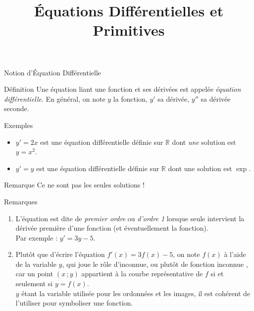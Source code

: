\documentclass{cours}
\title{Équations Différentielles et Primitives}
\begin{document}

    \begin{Gpartie}{Notion d'Équation Différentielle} 
        \begin{Spartie}{Définition} 
            Une équation liant une fonction et ses dérivées est appelée \emph{équation différentielle}. En général, on note $y$ la fonction, $y'$ sa dérivée, $y''$ sa dérivée seconde.
        \end{Spartie}
        \begin{Spartie}{Exemples} 
            \begin{itemize}
                \item $y'=2x$ est une équation différentielle définie sur $\mathbb{R}$ dont \textit{une} solution est~$y=x^2$.
                \item $y'=y$ est une équation différentielle définie sur $\mathbb{R}$ dont une solution est $\exp$.
            \end{itemize}
            \begin{SSpartie}{Remarque} 
                Ce ne sont pas les seules solutions !
            \end{SSpartie}
        \end{Spartie}
        \begin{Spartie}{Remarques} 
            \begin{enumerate}[(1)]
                \item L'équation est dite de \emph{premier ordre} ou \emph{d'ordre 1} lorsque seule intervient la dérivée première d'une fonction (et éventuellement la fonction). \\ Par exemple : $y'=3y-5$.
                \item Plutôt que d'écrire l'équation $f'(x)=3f(x)-5$, on note $f(x)$ à l'aide de la variable $y$, qui joue le rôle d'inconnue, ou plutôt de \og fonction inconnue \fg{}, car un point $(x\,; y)$ appartient à la courbe représentative de $f$ si et seulement si $y=f(x)$. \\ $y$ étant la variable utilisée pour les ordonnées et les images, il est cohérent de l'utiliser pour symboliser une fonction.
            \end{enumerate}
        \end{Spartie}
    \end{Gpartie}
\end{document}
